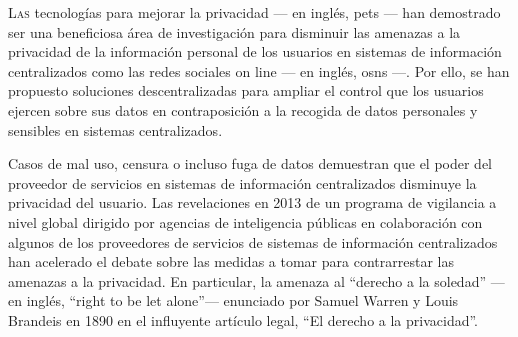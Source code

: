 


    
    {
    \lettrine{\textcolor[gray]{.25}{L}}{as} tecnologías para mejorar la privacidad 
    --- en inglés, \aclp*{pet} --- han demostrado ser una beneficiosa área de investigación 
    para disminuir las amenazas a la privacidad de la información personal de los 
    usuarios en sistemas de información centralizados como las redes sociales on 
    line --- en inglés, \aclp*{osn} ---. Por ello, se han propuesto soluciones descentralizadas 
    para ampliar el control que los usuarios ejercen sobre sus datos en contraposición 
    a la recogida de datos personales y sensibles en sistemas centralizados.\par
    }
    
    Casos de mal uso, censura o incluso fuga de datos demuestran que el poder del 
    proveedor de servicios en sistemas de información centralizados disminuye la 
    privacidad del usuario. Las revelaciones en 2013 de un programa de vigilancia 
    a nivel global dirigido por agencias de inteligencia públicas en colaboración 
    con algunos de los proveedores de servicios de sistemas de información centralizados 
    han acelerado el debate sobre las medidas a tomar para contrarrestar las amenazas 
    a la privacidad. En particular, la amenaza al ``derecho a la soledad'' --- en 
    inglés, ``right to be let alone''--- enunciado por Samuel Warren y Louis Brandeis 
    en 1890 en el influyente artículo legal, ``El derecho a la privacidad''.
    
